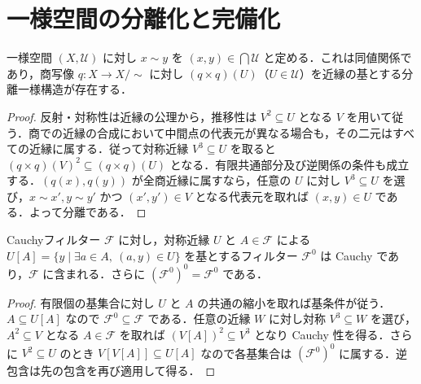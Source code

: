 \section{一様空間の分離化と完備化}
\begin{prop}[一様空間の分離商]
一様空間 $(X,\mathcal U)$ に対し $x\sim y$ を $(x,y)\in\bigcap\mathcal U$ と定める．これは同値関係であり，商写像 $q:X\to X/{\sim}$ に対し $(q\times q)(U)$（$U\in\mathcal U$）を近縁の基とする分離一様構造が存在する．
\end{prop}
\begin{proof}
反射・対称性は近縁の公理から，推移性は $V^2\subseteq U$ となる $V$ を用いて従う．商での近縁の合成において中間点の代表元が異なる場合も，その二元はすべての近縁に属する．従って対称近縁 $V^3\subseteq U$ を取ると $(q\times q)(V)^2\subseteq(q\times q)(U)$ となる．有限共通部分及び逆関係の条件も成立する．$(q(x),q(y))$ が全商近縁に属すなら，任意の $U$ に対し $V^3\subseteq U$ を選び，$x\sim x',y\sim y'$ かつ $(x',y')\in V$ となる代表元を取れば $(x,y)\in U$ である．よって分離である．
\end{proof}
\begin{prop}[Cauchyフィルターの縮小]
Cauchyフィルター $\mathcal F$ に対し，対称近縁 $U$ と $A\in\mathcal F$ による $U[A]=\{y\mid\exists a\in A,\ (a,y)\in U\}$ を基とするフィルター $\mathcal F^0$ は Cauchy であり，$\mathcal F$ に含まれる．さらに $(\mathcal F^0)^0=\mathcal F^0$ である．
\end{prop}
\begin{proof}
有限個の基集合に対し $U$ と $A$ の共通の縮小を取れば基条件が従う．$A\subseteq U[A]$ なので $\mathcal F^0\subseteq\mathcal F$ である．任意の近縁 $W$ に対し対称 $V^3\subseteq W$ を選び，$A^2\subseteq V$ となる $A\in\mathcal F$ を取れば $(V[A])^2\subseteq V^3$ となり Cauchy 性を得る．さらに $V^2\subseteq U$ のとき $V[V[A]]\subseteq U[A]$ なので各基集合は $(\mathcal F^0)^0$ に属する．逆包含は先の包含を再び適用して得る．
\end{proof}
